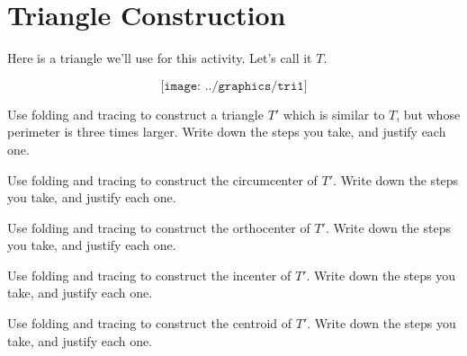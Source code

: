 \newpage
\section{Triangle Construction}

Here is a triangle we'll use for this activity.  Let's call it $T$.

\[
\texttt{[image: ../graphics/tri1]}
\]



\begin{prob}
Use folding and tracing to construct a triangle $T'$ which is similar to $T$, but whose perimeter is three times larger.  Write down the steps you take, and justify each one.
\end{prob}


\begin{prob}
Use folding and tracing to construct the circumcenter of $T'$.  Write down the steps you take, and justify each one.
\end{prob}


\begin{prob}
Use folding and tracing to construct the orthocenter of $T'$.  Write down the steps you take, and justify each one.
\end{prob}


\begin{prob}
Use folding and tracing to construct the incenter of $T'$.  Write down the steps you take, and justify each one.
\end{prob}


\begin{prob}
Use folding and tracing to construct the centroid of $T'$.  Write down the steps you take, and justify each one.
\end{prob}



